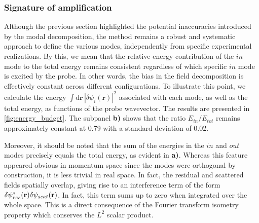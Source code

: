 \subsubsection{Signature of amplification}
Although the previous section highlighted the potential inaccuracies introduced by the modal decomposition, the method remains a robust and systematic approach to define the various modes, independently from specific experimental realizations. By this, we mean that the relative energy contribution of the \( in \) mode to the total energy remains consistent regardless of which specific \( in \) mode is excited by the probe. 
In other words, the bias in the field decomposition is effectively constant across different configurations.  
To illustrate this point, we calculate the energy \( \int \mathrm{d}\mathbf{r} \, |\delta\psi_i(\mathbf{r})|^2 \) associated with each mode, as well as the total energy, as functions of the probe wavevector. The results are presented in \autoref{fig:energy_budget}. 
The subpanel \textbf{b)} shows that the ratio \( E_{in}/E_{tot} \) remains approximately constant at 0.79 with a standard deviation of 0.02.  


Moreover, it should be noted that the sum of the energies in the \( in \) and \( out \) modes precisely equals the total energy, as evident in \textbf{a)}. Whereas this feature appeared obvious in momentum space since the modes were orthogonal by construction, it is less trivial in real space.
In fact, the residual and scattered fields spatially overlap, giving rise to an interference term of the form $\delta \psi_{res}^*(\mathbf{r}) \delta \psi_{scat}(\mathbf{r})$. In fact, this term sums up to zero when integrated over the whole space.
This is a direct consequence of the Fourier transform isometry property which conserves the $L^2$ scalar product.

\bigskip

